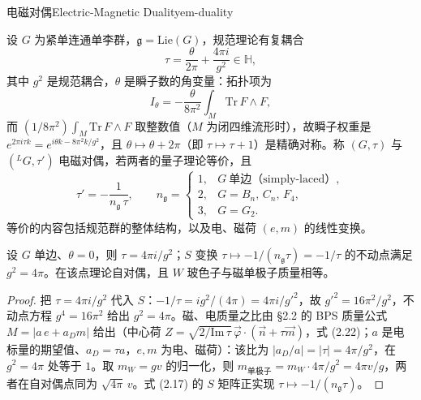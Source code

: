 
\begin{centry}{电磁对偶}{Electric-Magnetic Duality}{em-duality}

\begin{definition}
设 $G$ 为紧单连通单李群，$\mathfrak g=\mathrm{Lie}(G)$，规范理论有复耦合
\[
\tau=\frac{\theta}{2\pi}+\frac{4\pi i}{g^{2}}\in\mathbb H ,
\]
其中 $g^{2}$ 是规范耦合，$\theta$ 是瞬子数的角变量：拓扑项为
\[
I_{\theta}=-\frac{\theta}{8\pi^{2}}\int_{M}\mathrm{Tr}\,F\wedge F ,
\]
而 $(1/8\pi^{2})\int_{M}\mathrm{Tr}\,F\wedge F$ 取整数值（$M$ 为闭四维流形时），故瞬子权重是 $e^{2\pi i\tau k}=e^{i\theta k-8\pi^{2}k/g^{2}}$，且 $\theta\mapsto\theta+2\pi$（即 $\tau\mapsto\tau+1$）是精确对称。称 $(G,\tau)$ 与 $({}^{L}G,\tau')$ 电磁对偶，若两者的量子理论等价，且
\[
\tau'=-\frac{1}{n_{\mathfrak g}\,\tau},\qquad
n_{\mathfrak g}=\begin{cases}1,&G\ \text{单边（simply-laced）},\\ 2,&G=B_{n},\,C_{n},\,F_{4},\\ 3,&G=G_{2}.\end{cases}
\]
等价的内容包括规范群的整体结构，以及电、磁荷 $(e,m)$ 的线性变换。
\end{definition}

\begin{theorem}[单边情形的自对偶点]
设 $G$ 单边、$\theta=0$，则 $\tau=4\pi i/g^{2}$；$S$ 变换 $\tau\mapsto-1/(n_{\mathfrak g}\tau)=-1/\tau$ 的不动点满足 $g^{2}=4\pi$。在该点理论自对偶，且 $W$ 玻色子与磁单极子质量相等。
\end{theorem}
\begin{proof}
把 $\tau=4\pi i/g^{2}$ 代入 $S$：$-1/\tau=i g^{2}/(4\pi)=4\pi i/g'^{2}$，故 $g'^{2}=16\pi^{2}/g^{2}$，不动点方程 $g^{4}=16\pi^{2}$ 给出 $g^{2}=4\pi$。磁、电质量之比由 §2.2 的 BPS 质量公式 $M=|a\,e+a_{D}m|$ 给出（中心荷 $Z=\sqrt{2/\mathrm{Im}\,\tau}\,\vec\varphi\cdot(\vec n+\tau\vec m)$，式 (2.22)；$a$ 是电标量的期望值、$a_{D}=\tau a$，$e,m$ 为电、磁荷）：该比为 $|a_{D}/a|=|\tau|=4\pi/g^{2}$，在 $g^{2}=4\pi$ 处等于 $1$。取 $m_{W}=gv$ 的归一化，则 $m_{\text{单极子}}=m_{W}\cdot 4\pi/g^{2}=4\pi v/g$，两者在自对偶点同为 $\sqrt{4\pi}\,v$。式 (2.17) 的 $S$ 矩阵正实现 $\tau\mapsto-1/(n_{\mathfrak g}\tau)$。
\end{proof}


\end{centry}
